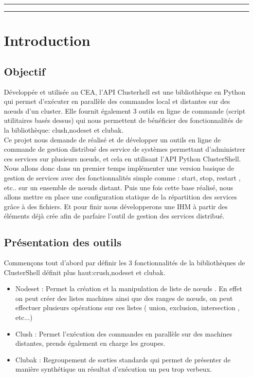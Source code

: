 \documentclass[a4paper,11pt]{article}
\begin{document}
\clearpage

\hrule\medskip

\begin{center}
  \tableofcontents
\end{center}

\medskip\hrule\bigskip\bigskip
\clearpage

\section{Introduction}
\label{sec:section1}
\subsection{Objectif}
\label{sub:1.1}
Développée et utilisée au CEA, l'API Clusterhell est une bibliothèque en Python qui permet d'exécuter en parallèle des commandes local et distantes sur des nœuds d'un cluster. Elle fournit également 3 outils en ligne de commande (script utilitaires basés dessus) qui nous permettent de bénéficier des fonctionnalités de la bibliothèque: clush,nodeset et clubak.
\\
Ce projet nous demande de réalisé et de développer un outils en ligne de commande de gestion distribué des service de systèmes permettant d'administrer ces services sur plusieurs nœuds, et cela en utilisant l'API Python ClusterShell.
\\
Nous allons donc dans un premier temps implémenter une version basique de gestion de services avec des fonctionnalités simple comme : start, stop, restart , etc.. sur un ensemble de nœuds distant. Puis une fois cette base réalisé, nous allons mettre en place une configuration statique de la répartition des services grâce à des fichiers. Et pour finir nous développerons une IHM à partir des éléments déjà crée afin de parfaire l'outil de gestion des services distribué.

\subsection{Présentation des outils}
\label{sub:1.2}
Commençons tout d'abord par définir les 3 fonctionnalités de la bibliothèques de ClusterShell définit plus haut:crush,nodeset et clubak.
\begin{itemize}
\item Nodeset : Permet la création et la manipulation de liste de nœuds . En effet on peut créer des listes machines ainsi que des ranges de nœuds, on peut effectuer plusieurs opérations sur ces listes ( union, exclusion, intersection , etc...)
\item Clush : Permet l'exécution des commandes en parallèle sur des machines distantes, prends également en charge les groupes.
\item Clubak : Regroupement de sorties standards qui permet de présenter de manière synthétique un résultat d'exécution un peu trop verbeux.
\end{itemize}\pagebreak
\end{document}
